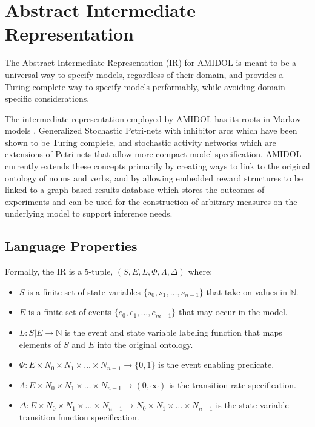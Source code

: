 \documentclass[11pt]{article}
\newcommand{\amidol}{\textsc{AMIDOL}}
\begin{document}
\section{Abstract Intermediate Representation}

The Abstract Intermediate Representation (IR) for \amidol{} is meant to be a universal way to specify models, regardless of their domain, and provides a Turing-complete way to specify models performably, while avoiding domain specific considerations.

The intermediate representation employed by \amidol{} has its roots in Markov models \cite{howard2012dynamic}, Generalized Stochastic Petri-nets with inhibitor arcs \cite{chiola1993generalized} which have been shown to be Turing complete, and stochastic activity networks \cite{movaghar1985performability,sanders2000stochastic} which are extensions of Petri-nets that allow more compact model specification.  \amidol{} currently extends these concepts primarily by creating ways to link to the original ontology of nouns and verbs, and by allowing embedded reward structures to be linked to a graph-based results database which stores the outcomes of experiments and can be used for the construction of arbitrary measures on the underlying model to support inference needs.

\subsection{Language Properties}

Formally, the IR is a 5-tuple, $(S, E, L, \Phi, \Lambda, \Delta)$ where:
\begin{itemize}
\item $S$ is a finite set of state variables $\{s_0, s_1, \ldots, s_{n-1}\}$ that take on values in $\mathbb{N}$.
\item $E$ is a finite set of events $\{e_0, e_1, \ldots, e_{m-1}\}$ that may occur in the model.
\item $L: S|E \rightarrow \mathbb{N}$ is the event and state variable labeling function that maps elements of $S$ and $E$ into the original ontology.
\item $\Phi: E \times N_0 \times N_1 \times \ldots \times N_{n-1} \rightarrow \{0, 1\}$ is the event enabling predicate.
\item $\Lambda: E \times N_0 \times N_1 \times \ldots \times N_{n-1} \rightarrow (0, \infty)$ is the transition rate specification.
\item $\Delta: E \times N_0 \times N_1 \times \ldots \times N_{n-1} \rightarrow N_0 \times N_1 \times \ldots \times N_{n-1}$ is the state variable transition function specification.
\end{itemize}
\end{document}
